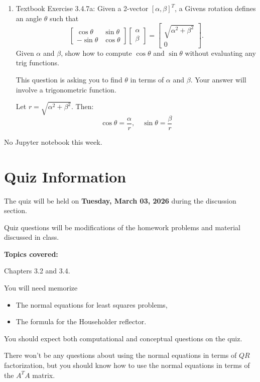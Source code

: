 \documentclass[reqno, answers]{exam}
\begin{document}
\begin{enumerate}
\begin{solution}
\textbf{(b)} Condition: $v^T x = 0$ (i.e., $x$ orthogonal to $v$). In $n$ dimensions, there are $n-1$ linearly independent such vectors.
\end{solution}

\item Textbook Exercise 3.4.7a: Given a 2-vector $[\alpha, \beta]^T$, a Givens rotation defines an angle $\theta$ such that
\[
\begin{bmatrix} \cos\theta & \sin\theta \\ -\sin\theta & \cos\theta \end{bmatrix} \begin{bmatrix} \alpha \\ \beta \end{bmatrix} = \begin{bmatrix} \sqrt{\alpha^2 + \beta^2} \\ 0 \end{bmatrix}.
\]
Given $\alpha$ and $\beta$, show how to compute $\cos\theta$ and $\sin\theta$ without evaluating any trig functions.

This question is asking you to find $\theta$ in terms of $\alpha$ and $\beta$. Your answer will involve a trigonometric function.

\begin{solution}
Let $r = \sqrt{\alpha^2 + \beta^2}$. Then:
\[
\cos\theta = \frac{\alpha}{r}, \quad \sin\theta = \frac{\beta}{r}
\]
\end{solution}

\end{enumerate}

No Jupyter notebook this week.



\section*{Quiz Information}

The quiz will be held on {\bf Tuesday, March 03, 2026} during the discussion section.

Quiz questions will be modifications of the homework problems and material discussed in class.

\textbf{Topics covered:} 

Chapters 3.2 and 3.4. 

You will need memorize 
\begin{itemize}
    \item The normal equations for least squares problems,
    \item The formula for the Householder reflector.
\end{itemize}

You should expect both computational and conceptual questions on the quiz.

There won't be any questions about using the normal equations in terms of $QR$ factorization, but you should know how to use the normal equations in terms of the $A^T A$ matrix.
\end{document}
